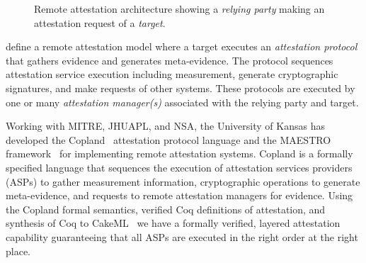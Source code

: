 \documentclass[runningheads]{llncs}
\begin{document}
\begin{figure}[hbtp]
  \centering
  \caption{Remote attestation architecture
  showing a \emph{relying party} making an attestation request of a
  \emph{target}.}
  \label{fig:remote-attestation}
\end{figure}

\citet{Coker::Principles-of-R,Coker:08:Attestation:-Ev} define a
remote attestation model where a target executes an \emph{attestation
  protocol} that gathers evidence and generates meta-evidence.  The
protocol sequences attestation service execution including
measurement, generate cryptographic signatures, and make requests of
other systems.  These protocols are executed by one or many
\emph{attestation manager(s)} associated with the relying party and
target.

Working with MITRE, JHUAPL, and NSA, the University of Kansas has
developed the Copland~\citep{Ramsdell:2019aa} attestation protocol
language and the MAESTRO framework~\citep{petz2022innovations} for
implementing remote attestation systems. Copland is a formally
specified language that sequences the execution of attestation
services providers (ASPs) to gather measurement information,
cryptographic operations to generate meta-evidence, and requests to
remote attestation managers for evidence. Using the Copland formal
semantics, verified Coq definitions of attestation, and synthesis of
Coq to CakeML~\citep{Kumar:2014:CVI:2535838.2535841} we have a
formally verified, layered attestation capability guaranteeing that
all ASPs are executed in the right order at the right place.
\end{document}
